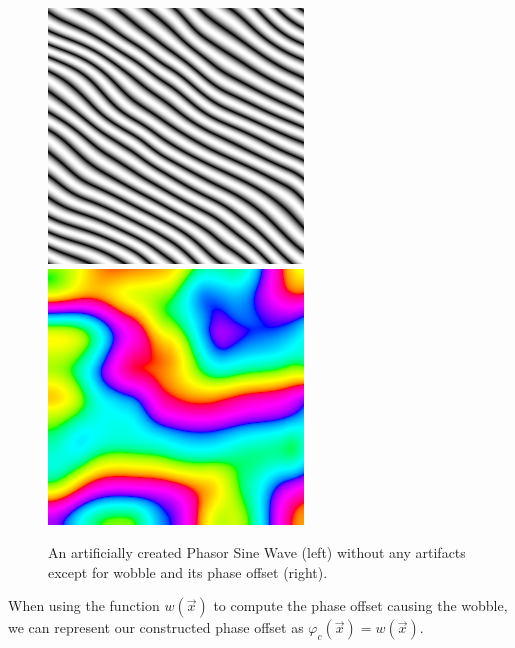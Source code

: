 \documentclass{utue} %
\begin{document}
\begin{figure}[h]
  \centering
  \includegraphics[width=0.45\linewidth]{images/wobble}
  \includegraphics[width=0.45\linewidth]{images/wobblePhase}
  \caption{An artificially created Phasor Sine Wave (left) without any artifacts except for wobble and its phase offset (right).}\label{fig:wobble}
\end{figure}
When using the function $w(\vec{x})$ to compute the phase offset causing the wobble, we can represent our constructed phase offset as $\varphi_c(\vec{x}) = w(\vec{x})$.
\end{document}
